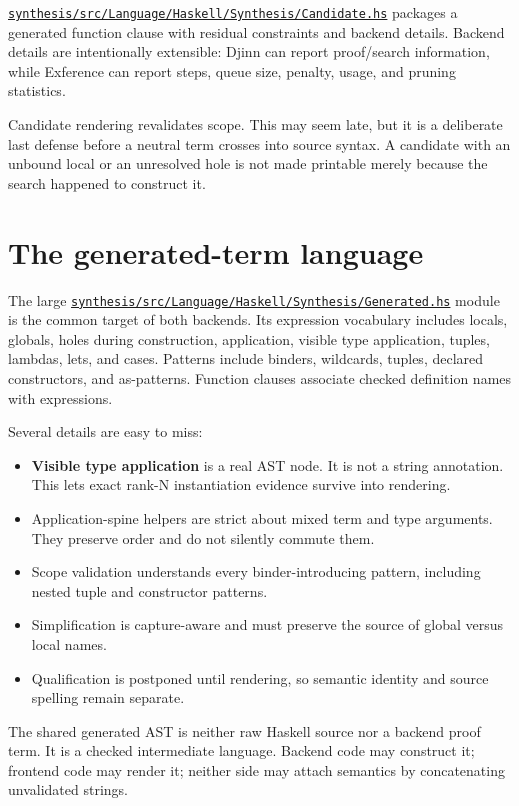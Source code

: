 \documentclass[10pt,letterpaper,oneside]{report}
\def\DjexBase{https://github.com/VladimirReshetnikov/Djex/blob/d3d9662598460316bdcd177ce6768c521e764aa8/}
\newcommand{\dpath}[1]{\href{\DjexBase#1}{\nolinkurl{#1}}}
\newcommand{\term}[1]{\textbf{#1}}
\begin{document}
\dpath{synthesis/src/Language/Haskell/Synthesis/Candidate.hs} packages a generated function clause with residual constraints and backend details. Backend details are intentionally extensible: Djinn can report proof/search information, while Exference can report steps, queue size, penalty, usage, and pruning statistics.

Candidate rendering revalidates scope. This may seem late, but it is a deliberate last defense before a neutral term crosses into source syntax. A candidate with an unbound local or an unresolved hole is not made printable merely because the search happened to construct it.

\section{The generated-term language}\label{sec:generated-ast}

The large \dpath{synthesis/src/Language/Haskell/Synthesis/Generated.hs} module is the common target of both backends. Its expression vocabulary includes locals, globals, holes during construction, application, visible type application, tuples, lambdas, lets, and cases. Patterns include binders, wildcards, tuples, declared constructors, and as-patterns. Function clauses associate checked definition names with expressions.

Several details are easy to miss:

\begin{itemize}
  \item \term{Visible type application} is a real AST node. It is not a string annotation. This lets exact rank-N instantiation evidence survive into rendering.
  \item Application-spine helpers are strict about mixed term and type arguments. They preserve order and do not silently commute them.
  \item Scope validation understands every binder-introducing pattern, including nested tuple and constructor patterns.
  \item Simplification is capture-aware and must preserve the source of global versus local names.
  \item Qualification is postponed until rendering, so semantic identity and source spelling remain separate.
\end{itemize}

\begin{invariantbox}
The shared generated AST is neither raw Haskell source nor a backend proof term. It is a checked intermediate language. Backend code may construct it; frontend code may render it; neither side may attach semantics by concatenating unvalidated strings.
\end{invariantbox}
\end{document}
